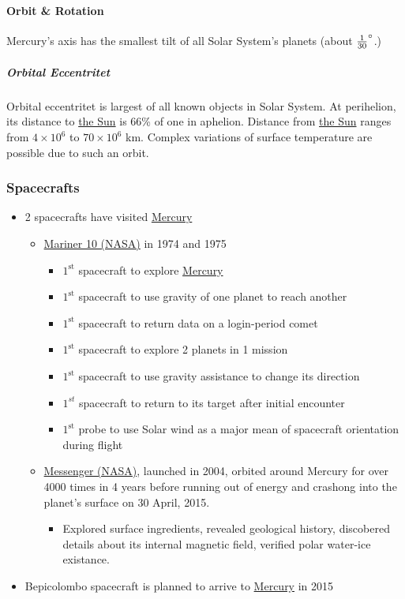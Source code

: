 \paragraph{Orbit \& Rotation}

Mercury's axis has the smallest tilt of all Solar System's planets (about
$\frac{1}{30}\degree$.)
\subparagraph{Orbital Eccentritet}
Orbital eccentritet is largest of all known objects in Solar System. At
perihelion, its distance to \hyperref[star:sun]{the Sun} is 66\% of one in
aphelion. Distance from \hyperref[star:sun]{the Sun} ranges from $4\times 10^6$
to $70\times 10^6$ km. Complex variations of surface temperature are possible
due to such an orbit.
\subsubsection{Spacecrafts}
\label{planet:mercury:spacecraft}
\begin{itemize}
	\item 2 spacecrafts have visited \hyperref[planet:mercury]{Mercury}
		\begin{itemize}
			\item \href{https://solarsystem.nasa.gov/missions/mariner-10/in-depth/}{Mariner 10
				(NASA)} in 1974 and 1975
				\label{planet:mercury:spacecraft:mariner10}
				\begin{itemize}
					\item $1^{\text{st}}$ spacecraft to
						explore
						\hyperref[planet:mercury]{Mercury}
					\item $1^{\text{st}}$ spacecraft to use
						gravity of one planet to reach
						another
					\item $1^{\text{st}}$ spacecraft to
						return data on a login-period
						comet
					\item $1^{\text{st}}$ spacecraft to
						explore 2 planets in 1 mission
					\item $1^{\text{st}}$ spacecraft to use
						gravity assistance to change its
						direction
					\item $1^{st}$ spacecraft to return to
						its target after initial
						encounter
					\item $1^{\text{st}}$ probe to use Solar
						wind as a major mean of
						spacecraft orientation during
						flight
				\end{itemize}
			\item
				\href{https://solarsystem.nasa.gov/missions/messenger/in-depth/}{Messenger
				(NASA)}, launched in 2004, orbited around
				Mercury for over 4000 times in 4 years before
				running out of energy and crashong into the
				planet's surface on 30 April, 2015.
				\begin{itemize}
					\item Explored surface ingredients,
						revealed geological history,
						discobered details about its
						internal magnetic field,
						verified polar water-ice
						existance.
				\end{itemize}

		\end{itemize}
	\item Bepicolombo spacecraft is planned to arrive to
		\hyperref[planet:mercury]{Mercury} in 2015
\end{itemize}
